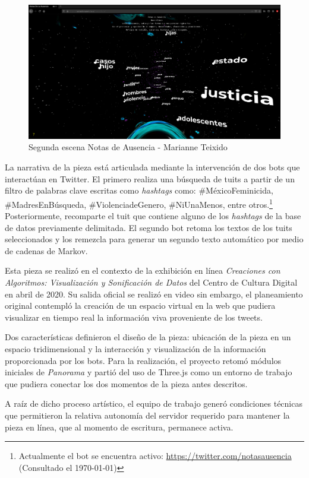 \begin{figure}
  \includegraphics[width=\textwidth]{img/notas03.png}
  \caption{Segunda escena Notas de Ausencia - Marianne Teixido}
\label{fig:notas2}
\end{figure}


La narrativa de la pieza está articulada mediante la intervención de dos bots que interactúan en Twitter. El primero realiza una búsqueda de tuits a partir de un filtro de palabras clave escritas como \emph{hashtags} como: \#MéxicoFeminicida, \#MadresEnBúsqueda, \#ViolenciadeGenero, \#NiUnaMenos, entre otros.\footnote{Actualmente el bot se encuentra activo: \url{https://twitter.com/notasausencia} (Consultado el \today)} Posteriormente, recomparte el tuit que contiene alguno de los \textit{hashtags} de la base de datos previamente delimitada. El segundo bot retoma los textos de los tuits seleccionados y los remezcla para generar un segundo texto automático por medio de cadenas de Markov. 

Esta pieza se realizó en el contexto de la exhibición en línea \textit{Creaciones con Algoritmos: Visualización y Sonificación de Datos} del Centro de Cultura Digital en abril de 2020. Su salida oficial se realizó en video sin embargo, el planeamiento original contempló la creación de un espacio virtual en la web que pudiera visualizar en tiempo real la información viva proveniente de los tweets.

Dos características definieron el diseño de la pieza: ubicación de la pieza en un espacio tridimensional y la interacción y visualización de la información proporcionada por los bots. Para la realización, el proyecto retomó módulos iniciales de \textit{Panorama} y partió del uso de Three.js como un entorno de trabajo que pudiera conectar los dos momentos de la pieza antes descritos. 

A raíz de dicho proceso artístico, el equipo de trabajo generó condiciones técnicas que permitieron la relativa autonomía del servidor requerido para mantener la pieza en línea, que al momento de escritura, permanece activa.

